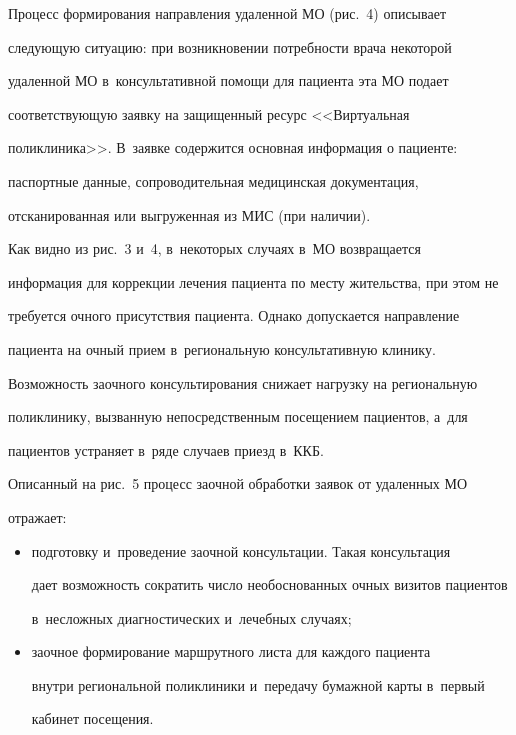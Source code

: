   


  Процесс формирования направления удаленной МО (рис.~4) описывает 


следующую ситуацию: при возникновении потребности врача некоторой 


удаленной МО в~консультативной помощи для пациента эта МО подает 


соответствующую заявку на защищенный ресурс <<Виртуальная 


поликлиника>>. В~заявке содержится основная информация о пациенте: 


паспортные данные, сопроводительная медицинская документация, 


отсканированная или выгруженная из МИС (при наличии). 











  Как видно из рис.~3 и~4, в~некоторых случаях в~МО возвращается 


информация для коррекции лечения пациента по месту жительства, при этом не 


требуется очного присутствия пациента. Однако допускается направление 


пациента на очный прием в~региональную консультативную клинику. 


Возможность заочного консультирования снижает нагрузку на региональную 


поликлинику, вызванную непосредственным посещением пациентов, а~для 


пациентов устраняет в~ряде случаев приезд в~ККБ. 


  


  Описанный на рис.~5 процесс заочной обработки заявок от удаленных МО 


отражает:


  \begin{itemize}


  \item  подготовку и~проведение заочной консультации. Такая консультация 


дает возможность сократить число необоснованных очных визитов пациентов 


в~несложных диагностических и~лечебных случаях;


  \item заочное формирование маршрутного листа для каждого пациента 


внутри региональной поликлиники и~передачу бумажной карты в~первый 


кабинет посещения.


  \end{itemize}


